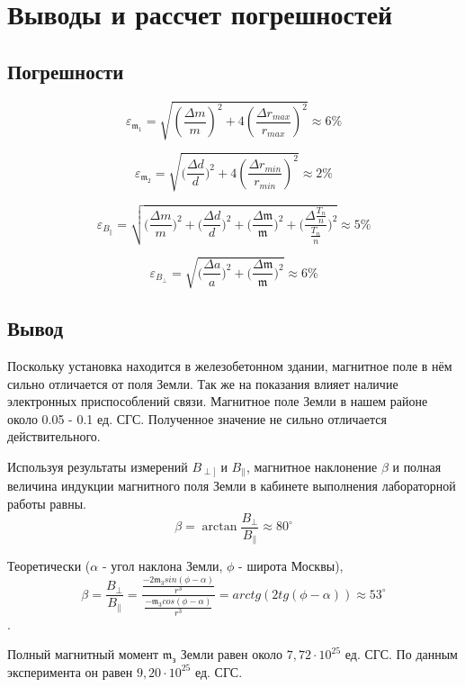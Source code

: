 \documentclass[a4paper,12pt]{article}
\begin{document}
\newpage
\section{Выводы и рассчет погрешностей}
\subsection{Погрешности}

\[ \varepsilon_{\mathfrak{m_1}} = \sqrt{\left(\frac{\Delta m}m\right)^2 + 4\left(\frac{\Delta r_{max}}{r_{max}}\right)^2} \approx 6 \%\]

\[ \varepsilon_{\mathfrak{m_2}} = \sqrt{\Big(\frac{\Delta d}d\Big)^2 + 4\left(\frac{\Delta r_{min}}{r_{min}}\right)^2}\approx 2 \%\]

\[\varepsilon_{B_{\|}} = \sqrt{\Big(\frac{\Delta m}m\Big)^2 + \Big(\frac{\Delta d}d\Big)^2 + \Big(\frac{\Delta \mathfrak{m}}{\mathfrak{m}}\Big)^2 + \Big(\frac{\Delta \frac{T_n}{n}}{\frac{T_n}{n}}\Big)^2} \approx 5 \% \]

\[\varepsilon_{B_{\perp}} = \sqrt{\Big(\frac{\Delta a}a\Big)^2 + \Big(\frac{\Delta \mathfrak{m}}{\mathfrak{m}}\Big)^2} \approx 6 \%\]


\subsection{Вывод}
Поскольку  установка находится в железобетонном
здании, магнитное поле в нём сильно отличается от поля Земли. Так же на
показания влияет наличие электронных приспособлений связи. Магнитное
поле Земли в нашем районе около 0.05 - 0.1 ед. СГС. Полученное значение не сильно отличается действительного.

Используя результаты измерений $B_{\perp]}$ и $B_{\|}$, магнитное наклонение $\beta$ и полная величина индукции магнитного поля Земли в кабинете выполнения лабораторной работы равны.
$$\beta = \arctan{\frac{B_{\perp}}{B_{\|}}} \approx 80^{\circ}  $$

Теоретически ($\alpha$ - угол наклона Земли, $\phi$ - широта Москвы),
\[\beta = \frac{B_{\perp}}{B_{\|}} = \frac{\frac{-2\mathfrak{m}_3sin(\phi-\alpha)}{r^3}}{\frac{-\mathfrak{m}_3cos(\phi-\alpha)}{r^3}} = arctg(2 tg(\phi - \alpha)) \approx 53^{\circ}\].

Полный магнитный момент $\mathfrak{m_{з}}$ Земли равен около $7,72 \cdot 10^{25}$ ед.  СГС. По данным эксперимента он равен $9,20 \cdot 10^{25}$ ед. СГС.
\end{document}
